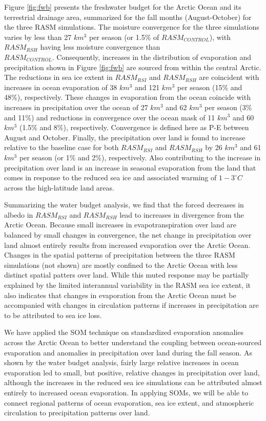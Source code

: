 \documentclass[draft,linenumbers]{agujournal}
\begin{document}
Figure \ref{fig:fwb} presents the freshwater budget for the Arctic Ocean and its terrestrial drainage area, summarized for the fall months (August-October) for the three RASM simulations.
The  moisture convergence for the three simulations varies by less than 27 $km^3$ per season (or 1.5\% of $RASM_{CONTROL}$), with $RASM_{RSH}$ having less moisture convergence than\\ $RASM_{CONTROL}$.
Consequently, increases in the distribution of evaporation and precipitation shown in Figure \ref{fig:fwb} are sourced from within the central Arctic.
The reductions in sea ice extent in $RASM_{RSI}$ and $RASM_{RSH}$ are coincident with increases in ocean evaporation of 38 $km^3$ and 121 $km^3$ per season (15\% and 48\%), respectively.
These changes in evaporation from the ocean coincide with increases in precipitation over the ocean of 27 $km^3$ and 62 $km^3$ per season (3\% and 11\%) and reductions in convergence over the ocean mask of 11 $km^3$ and 60 $km^3$ (1.5\% and 8\%), respectively.
Convergence is defined here as P-E between August and October.
Finally, the precipitation over land is found to increase relative to the baseline case for both $RASM_{RSI}$ and $RASM_{RSH}$ by 26 $km^3$ and 61 $km^3$ per season (or 1\% and 2\%), respectively.
Also contributing to the increase in precipitation over land is an increase in seasonal evaporation from the land that comes in response to the reduced sea ice and associated warming of $1-3^{\circ}C$ across the high-latitude land areas.

Summarizing the water budget analysis, we find that the forced decreases in albedo in $RASM_{RSI}$ and $RASM_{RSH}$ lead to increases in divergence from the Arctic Ocean.
Because small increases in evapotranspiration over land are balanced by small changes in convergence, the net change in precipitation over land almost entirely results from increased evaporation over the Arctic Ocean.
Changes in the spatial patterns of precipitation between the three RASM simulations (not shown) are mostly confined to the Arctic Ocean with less distinct spatial patters over land.
While this muted response may be partially explained by the limited interannual variability in the RASM sea ice extent, it also indicates that changes in evaporation from the Arctic Ocean must be accompanied with changes in circulation patterns if increases in precipitation are to be attributed to sea ice loss.

We have applied the SOM technique on standardized evaporation anomalies across the Arctic Ocean to better understand the coupling between ocean-sourced evaporation and anomalies in precipitation over land during the fall season.
As shown by the water budget analysis, fairly large relative increases in ocean evaporation led to small, but positive, relative changes in precipitation over land, although the increases in the reduced sea ice simulations can be attributed almost entirely to increased ocean evaporation.
In applying SOMs, we will be able to connect regional patterns of ocean evaporation, sea ice extent, and atmospheric circulation to precipitation patterns over land.
\end{document}
